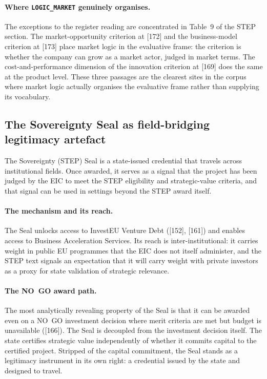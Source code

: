 \paragraph{Where \texttt{LOGIC\_MARKET} genuinely organises.}
The exceptions to the register reading are concentrated in Table~9 of
the STEP section. The market-opportunity criterion at [172] and the
business-model criterion at [173] place market logic in the
evaluative frame: the criterion is whether the company can grow as a
market actor, judged in market terms. The cost-and-performance
dimension of the innovation criterion at [169] does the same at the
product level. These three passages are the clearest sites in the
corpus where market logic actually organises the evaluative frame
rather than supplying its vocabulary.

\subsection{The Sovereignty Seal as field-bridging legitimacy
artefact}
\label{sec:res-step-seal}

The Sovereignty (STEP) Seal is a state-issued credential that travels
across institutional fields. Once awarded, it serves as a signal that
the project has been judged by the EIC to meet the STEP eligibility
and strategic-value criteria, and that signal can be used in
settings beyond the STEP award itself.

\paragraph{The mechanism and its reach.}
The Seal unlocks access to InvestEU Venture Debt ([152], [161]) and
enables access to Business Acceleration Services. Its reach is
inter-institutional: it carries weight in public EU programmes that
the EIC does not itself administer, and the STEP text signals an
expectation that it will carry weight with private investors as a
proxy for state validation of strategic relevance.

\paragraph{The NO~GO award path.}
The most analytically revealing property of the Seal is that it can
be awarded even on a NO~GO investment decision where merit criteria
are met but budget is unavailable ([166]). The Seal is decoupled
from the investment decision itself. The state certifies strategic
value independently of whether it commits capital to the certified
project. Stripped of the capital commitment, the Seal stands as a
legitimacy instrument in its own right: a credential issued by the
state and designed to travel.

